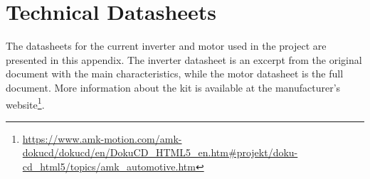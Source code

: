 
\chapter{Technical Datasheets}
\label{chapter:appendixDatasheets} %

The datasheets for the current inverter and motor used in the project are presented in this appendix. The inverter datasheet is an excerpt from the original document with the main characteristics, while the motor datasheet is the full document. More information about the kit is available at the manufacturer's website\footnote{\url{https://www.amk-motion.com/amk-dokucd/dokucd/en/DokuCD_HTML5_en.htm\#projekt/doku-cd_html5/topics/amk_automotive.htm}}.


% 
\def\excerpt{\section{AMK Motor Datasheet}\label{section:AMK_Motor_datasheet}}





